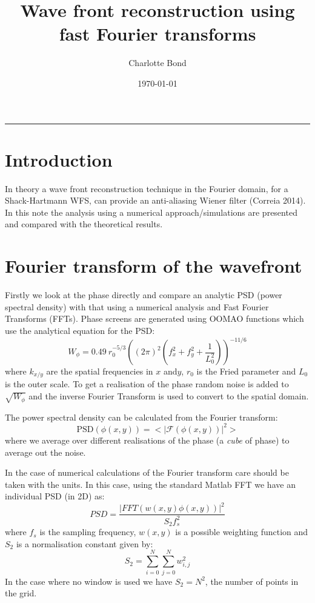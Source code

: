 \documentclass[pdf]{note}
\author{Charlotte Bond}
\title{Wave front reconstruction using fast Fourier transforms}
\date{\today}
\begin{document}
\maketitle
\tableofcontents
\vspace{1cm}\hrule \vspace{1cm}

\section{Introduction}
In theory a wave front reconstruction technique in the Fourier domain, for
a Shack-Hartmann WFS, can provide an anti-aliasing Wiener filter (Correia 2014).
In this note the analysis using a numerical approach/simulations are presented and
compared with the theoretical results. 


\section{Fourier transform of the wavefront}

Firstly we look at the phase directly and compare an analytic PSD (power spectral density) 
with that using a numerical analysis and Fast Fourier Transforms (FFTs).
Phase screens are generated using OOMAO functions which use
the analytical equation for the PSD:
\begin{equation}
W_{\phi} = 0.49 \ r_0^{-5/3} \left((2\pi)^2 \left(f_x^2+f_y^2+\frac{1}{L_0^2}\right)\right)^{-11/6}
\end{equation}
where $k_{x/y}$ are the spatial frequencies in $x$ and$y$, $r_0$ is the Fried parameter
and $L_0$ is the outer scale.
To get a realisation of the phase random noise is added to $\sqrt{W_{\phi}}$ and
the inverse Fourier Transform is used to convert to the spatial domain.

The power spectral density can be calculated from the Fourier transform:
\begin{equation}
\mathrm{PSD}(\phi(x,y)) = < \left| \mathcal{F} (\phi(x,y))\right|^2 >
\end{equation}
where we average over different realisations of the phase (a \emph{cube} of phase)
to average out the noise.

In the case of numerical calculations of the Fourier transform care should be
taken with the units.  In this case, using the standard Matlab FFT we have an
individual PSD (in 2D) as:
\begin{equation}
PSD = \frac{|FFT(w(x,y)\phi(x,y))|^2}{S_2 f_s^2} 
\end{equation}
where $f_s$ is the sampling frequency, $w(x,y)$ is a possible weighting function
and $S_2$ is a normalisation constant given by:
\begin{equation}
S_2 = \sum_{i=0}^N \sum_{j=0}^N w_{i,j}^2
\end{equation}
In the case where no window is used we have $S_2 = N^2$, the number of
points in the grid.
\end{document}
